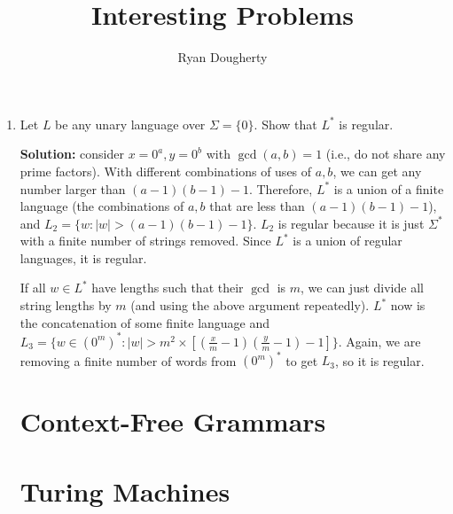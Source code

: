 \documentclass[10pt]{article}
\title{Interesting Problems}
\author{Ryan Dougherty}
\date{}
\begin{document}
\maketitle

\begin{enumerate}
\section{Finite Automata}
\item Let $L$ be any unary language over $\Sigma = \{0\}$. Show that $L^*$ is regular.

\par\textbf{Solution:} consider $x = 0^a, y = 0^b$ with $\gcd(a, b) = 1$ (i.e., do not share any prime factors). With different combinations of uses of $a, b$, we can get any number larger than $(a-1)(b-1) - 1$. Therefore, $L^*$ is a union of a finite language (the combinations of $a, b$ that are less than $(a-1)(b-1)-1$), and $L_2 = \{w \colon |w| > (a-1)(b-1)-1\}$. $L_2$ is regular because it is just $\Sigma^*$ with a finite number of strings removed. Since $L^*$ is a union of regular languages, it is regular. 

\par If all $w \in L^*$ have lengths such that their $\gcd$ is $m$, we can just divide all string lengths by $m$ (and using the above argument repeatedly). $L^*$ now is the concatenation of some finite language and $L_3 = \{w \in (0^m)^* \colon |w| > m^2 \times [(\frac{x}{m}-1)(\frac{y}{m}-1) -1]\}$. Again, we are removing a finite number of words from $(0^m)^*$ to get $L_3$, so it is regular. 

\section{Context-Free Grammars}

\section{Turing Machines}

\end{enumerate}
\end{document}
